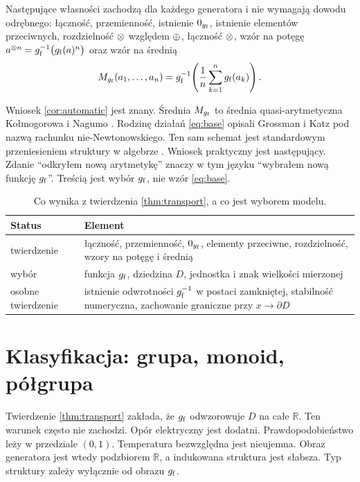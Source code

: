 \documentclass[11pt,a4paper]{article}
\begin{document}
\begin{corollary}
\label{cor:automatic}
Następujące własności zachodzą dla każdego generatora i nie wymagają dowodu
odrębnego: łączność, przemienność, istnienie $0_{g_{\mathrm{f}}}$, istnienie elementów
przeciwnych, rozdzielność $\mathbin{\otimes}$ względem $\mathbin{\oplus}$, łączność $\mathbin{\otimes}$, wzór na
potęgę $a^{\mathbin{\otimes} n}=g_{\mathrm{f}}^{-1}\big(g_{\mathrm{f}}(a)^{n}\big)$ oraz wzór na średnią
\[
M_{g_{\mathrm{f}}}(a_{1},\dots,a_{n})=g_{\mathrm{f}}^{-1}\!\left(\frac{1}{n}\sum_{k=1}^{n}g_{\mathrm{f}}(a_{k})\right).
\]
\end{corollary}

Wniosek \ref{cor:automatic} jest znany. Średnia $M_{g_{\mathrm{f}}}$ to średnia
quasi-arytmetyczna Kołmogorowa i Nagumo \cite{kolmogorov1930,nagumo1930}.
Rodzinę działań \eqref{eq:base} opisali Grossman i Katz \cite{grossman1972}
pod nazwą rachunku nie-Newtonowskiego. Ten sam schemat jest standardowym
przeniesieniem struktury w algebrze \cite{aczel1966}. Wniosek praktyczny jest
następujący. Zdanie \enquote{odkryłem nową arytmetykę} znaczy w tym języku
\enquote{wybrałem nową funkcję $g_{\mathrm{f}}$}. Treścią jest wybór $g_{\mathrm{f}}$, nie wzór
\eqref{eq:base}.

\begin{table}[t]
\centering
\small
\caption{Co wynika z twierdzenia \ref{thm:transport}, a co jest wyborem
modelu.}
\label{tab:automatic}
\begin{tabularx}{\textwidth}{@{}lX@{}}
\toprule
\textbf{Status} & \textbf{Element} \\
\midrule
twierdzenie & łączność, przemienność, $0_{g_{\mathrm{f}}}$, elementy przeciwne,
rozdzielność, wzory na potęgę i średnią \\
wybór & funkcja $g_{\mathrm{f}}$, dziedzina $D$, jednostka i znak wielkości mierzonej \\
osobne twierdzenie & istnienie odwrotności $g_{\mathrm{f}}^{-1}$ w postaci zamkniętej,
stabilność numeryczna, zachowanie graniczne przy $x\to\partial D$ \\
\bottomrule
\end{tabularx}
\end{table}

\section{Klasyfikacja: grupa, monoid, półgrupa}

Twierdzenie \ref{thm:transport} zakłada, że $g_{\mathrm{f}}$ odwzorowuje $D$ na całe
$\mathbb{R}$. Ten warunek często nie zachodzi. Opór elektryczny jest dodatni.
Prawdopodobieństwo leży w przedziale $(0,1)$. Temperatura bezwzględna jest
nieujemna. Obraz generatora jest wtedy podzbiorem $\mathbb{R}$, a indukowana
struktura jest słabsza. Typ struktury zależy wyłącznie od obrazu $g_{\mathrm{f}}$.
\end{document}
